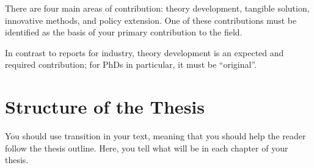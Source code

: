 There are four main areas of contribution: theory development, tangible solution, innovative methods, and policy extension. One of these contributions must be identified as the basis of your primary contribution to the field.

In contrast to reports for industry, theory development is an expected and required contribution; for PhDs in particular, it must be ``original''.

\section{Structure of the Thesis}
\label{section:structure} 

You should use transition in your text, meaning that you should help the reader follow the thesis outline. Here, you tell what will be in each chapter of your thesis. 

